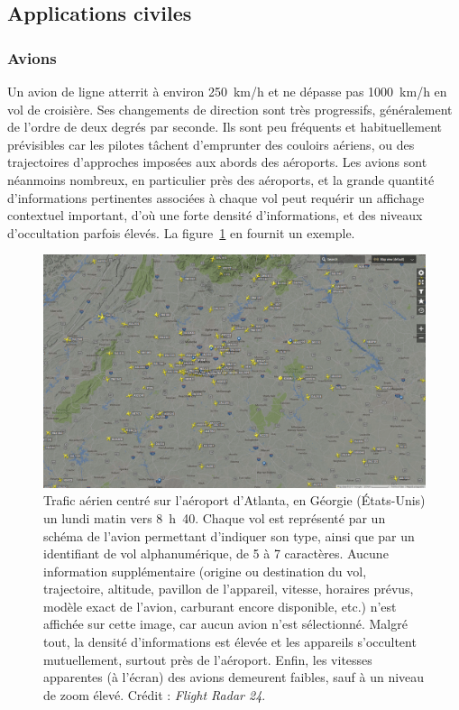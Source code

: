	\FloatBarrier \subsection{Applications civiles}
	
	\subsubsection{Avions}
	Un avion de ligne atterrit à environ 250~km/h et ne dépasse pas 1000~km/h en vol de croisière. Ses changements de direction sont très progressifs, généralement de l'ordre de deux degrés par seconde. Ils sont peu fréquents et habituellement prévisibles car les pilotes tâchent d'emprunter des couloirs aériens, ou des trajectoires d'approches imposées aux abords des aéroports. Les avions sont néanmoins nombreux, en particulier près des aéroports, et la grande quantité d'informations pertinentes associées à chaque vol peut requérir un affichage contextuel important, d'où une forte densité d'informations, et des niveaux d'occultation parfois élevés. La figure~\ref{fig:atlanta} en fournit un exemple.
	
	\begin{figure}[!htbp]
		\centering
		\includegraphics[width=\textwidth]{figures/ch1/atlanta}
		\caption[Trafic aérien, Atlanta]{Trafic aérien centré sur l'aéroport d'Atlanta, en Géorgie (États-Unis) un lundi matin vers 8~h~40. Chaque vol est représenté par un schéma de l'avion permettant d'indiquer son type, ainsi que par un identifiant de vol alphanumérique, de 5 à 7 caractères. Aucune information supplémentaire (origine ou destination du vol, trajectoire, altitude, pavillon de l'appareil, vitesse, horaires prévus, modèle exact de l'avion, carburant encore disponible, etc.) n'est affichée sur cette image, car aucun avion n'est sélectionné. Malgré tout, la densité d'informations est élevée et les appareils s'occultent mutuellement, surtout près de l'aéroport. Enfin, les vitesses apparentes (à l'écran) des avions demeurent faibles, sauf à un niveau de zoom élevé. Crédit : \emph{Flight Radar 24\footnotemark}.}
		\label{fig:atlanta}
	\end{figure}
	
